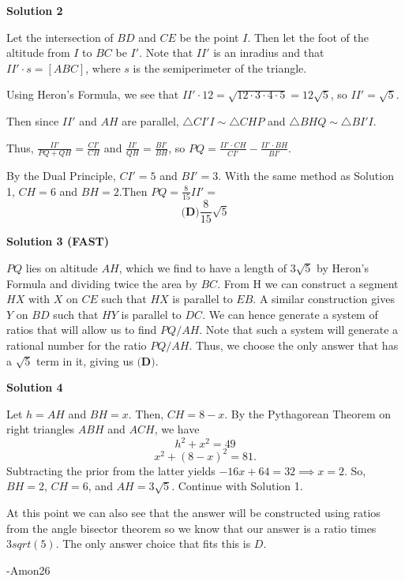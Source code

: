 \begin{enumerate}
\textbf{Solution 2}

Let the intersection of $BD$ and $CE$ be the point $I$. Then let the foot of the altitude from $I$ to $BC$ be $I'$. Note that $II'$ is an inradius and that $II' \cdot s = [ABC]$, where $s$ is the semiperimeter of the triangle.

 Using Heron's Formula, we see that $II' \cdot 12 =  \sqrt{12 \cdot 3 \cdot 4 \cdot 5} = 12\sqrt{5}$, so $II' = \sqrt{5}$.

 Then since $II'$ and $AH$ are parallel, $\triangle CI'I \sim \triangle CHP$ and $\triangle BHQ \sim \triangle BI'I$.

 Thus, $\frac{II'}{PQ + QH} = \frac{CI'}{CH}$ and $\frac{II'}{QH} = \frac{BI'}{BH}$, so $PQ = \frac{II' \cdot CH}{CI'} - \frac{II' \cdot BH}{BI'}$.

 By the Dual Principle, $CI' = 5$ and $BI' = 3$. With the same method as Solution 1, $CH = 6$ and $BH = 2$.Then $PQ  = \frac{8}{15} II' =$ 
 \[\boxed{\textbf{(D)}\frac{8}{15}\sqrt{5}}\]




\textbf{Solution 3 (FAST)}

$PQ$ lies on altitude $AH$, which we find to have a length of $3\sqrt{5}$ by Heron's Formula and dividing twice the area by $BC$. From H we can construct a segment $HX$ with $X$ on $CE$ such that $HX$ is parallel to $EB$. A similar construction gives $Y$ on $BD$ such that $HY$ is parallel to $DC$. We can hence generate a system of ratios that will allow us to find $PQ/AH$. Note that such a system will generate a rational number for the ratio $PQ/AH$. Thus, we choose the only answer that has a $\sqrt{5}$ term in it, giving us $\boxed{\textbf{(D)}}$.

 



\textbf{Solution 4}

Let $h=AH$ and $BH=x$.  Then, $CH=8-x$.  By the Pythagorean Theorem on right triangles $ABH$ and $ACH$, we have 
 \[h^2+x^2=49\] 
 \[x^2+(8-x)^2=81.\]  Subtracting the prior from the latter yields $-16x+64=32\implies x=2$.  So, $BH=2$, $CH=6$, and $AH=3\sqrt{5}$.  Continue with Solution 1.

 At this point we can also see that the answer will be constructed using ratios from the angle bisector theorem so we know that our answer is a ratio times $3sqrt(5)$. The only answer choice that fits this is $D$.

 -Amon26

 



\end{enumerate}
